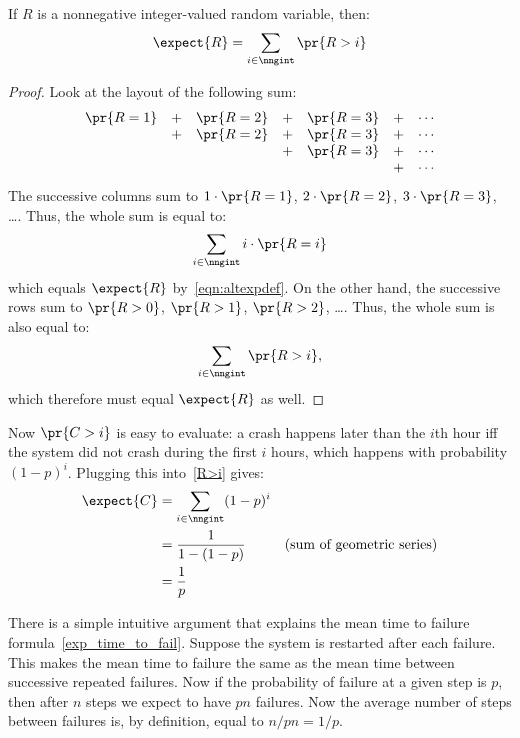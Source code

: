 \begin{editingnotes}
\begin{lemma}
If $R$ is a nonnegative integer-valued random variable, then:
%
\begin{equation}\label{R>i}
\expect{R} = \sum_{i \in \nngint} \pr{R > i}
\end{equation}
\end{lemma}

\begin{proof}
Look at the layout of the following sum:
%
\[
\begin{array}{ccccccc}
\pr{R = 1} & + & \pr{R = 2} & + & \pr{R = 3} & + & \cdots \\
           & + & \pr{R = 2} & + & \pr{R = 3} & + & \cdots \\
           &   &            & + & \pr{R = 3} & + & \cdots \\
           &   &            &   &            & + & \cdots
\end{array}
\]
%
The successive columns sum to $1 \cdot \pr{R = 1}$, $2 \cdot \pr{R = 2}$,
$3 \cdot \pr{R = 3}$, \dots.  Thus, the whole sum is equal to:
%
\[
\sum_{i \in \nngint} i \cdot \pr{R = i}
\]
which equals $\expect{R}$ by~\eqref{eqn:altexpdef}.  On the other hand, the
successive rows sum to $\pr{R > 0}$, $\pr{R > 1}$, $\pr{R > 2}$, \dots.
Thus, the whole sum is also equal to:
%
\[
\sum_{i \in \nngint} \pr{R > i},
\]
%
which therefore must equal $\expect{R}$ as well.
\end{proof}

Now $\pr{C > i}$ is easy to evaluate: a crash happens later than the $i$th
hour iff the system did not crash during the first $i$ hours, which
happens with probability $(1-p)^i$.  Plugging this into~\eqref{R>i} gives:
%
\begin{align*}
\expect{C} & = \sum_{i \in \nngint} (1-p)^i \\
       & = \frac{1}{1 - (1-p)} & \text{(sum of geometric series)}\\
       & = \frac{1}{p}
\end{align*}
\end{editingnotes}

There is a simple intuitive argument that explains the mean time to
failure formula~\eqref{exp_time_to_fail}.  Suppose the system is
restarted after each failure.  This makes the mean time to failure the
same as the mean time between successive repeated failures.  Now if
the probability of failure at a given step is $p$, then after $n$
steps we expect to have $pn$ failures.  Now the average number of
steps between failures is, by definition, equal to $n/pn = 1/p$.

